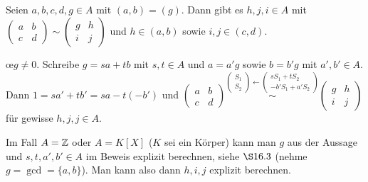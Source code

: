 \documentclass[../../main.tex]{subfiles}
\begin{document}
\begin{lem}\label{17.1.5}
Seien $a,b,c,d,g\in A$ mit $(a,b)=(g)$. Dann gibt es $h,j,i\in A$ mit $\begin{pmatrix*}a & b \\ c & d\end{pmatrix*}\sim \begin{pmatrix*}g & h \\ i & j\end{pmatrix*}$ und $h\in (a,b)$ sowie $i,j\in (c,d)$.
\end{lem}
\begin{cproof}
\oe $g\neq 0$. Schreibe $g=sa+tb$ mit $s,t\in A$ und $a=a'g$ sowie $b=b'g$ mit $a',b'\in A$. Dann $1=sa'+tb'=sa-t(-b')$ und $\begin{pmatrix*}a & b \\ c & d\end{pmatrix*}\stackrel{\left(\begin{smallmatrix}S_1\\ S_2\end{smallmatrix}\right)\leftarrow\left(\begin{smallmatrix}sS_1+tS_2\\ -b'S_1+a'S_2\end{smallmatrix}\right)}{\sim}\begin{pmatrix*}g & h \\ i & j\end{pmatrix*}$ für gewisse $h,j,j\in A$.
\end{cproof}

\begin{bem}\label{17.1.6}
Im Fall $A=\mathbb Z$ oder $A=K[X]$ ($K$ sei ein Körper) kann man $g$ aus der Aussage und $s,t,a',b'\in A$ im Beweis explizit berechnen, siehe $\S16.3$ (nehme $g=\gcd=\{a,b\}$). Man kann also dann $h,i,j$ explizit berechnen.
\end{bem}
\end{document}
